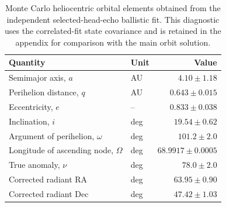 \begin{table}
  \centering
  \caption{Monte Carlo heliocentric orbital elements obtained from the
  independent selected-head-echo ballistic fit.  This diagnostic uses the
  correlated-fit state covariance and is retained in the appendix for
  comparison with the main orbit solution.}
  \label{tab:appendix-selected-head-echo-orbit}
  \begin{tabular}{llr}
    \toprule
    Quantity & Unit & Value \\
    \midrule
    Semimajor axis, $a$ & AU & $4.10 \pm 1.18$ \\
    Perihelion distance, $q$ & AU & $0.643 \pm 0.015$ \\
    Eccentricity, $e$ & -- & $0.833 \pm 0.038$ \\
    Inclination, $i$ & deg & $19.54 \pm 0.62$ \\
    Argument of perihelion, $\omega$ & deg & $101.2 \pm 2.0$ \\
    Longitude of ascending node, $\Omega$ & deg & $68.9917 \pm 0.0005$ \\
    True anomaly, $\nu$ & deg & $78.0 \pm 2.0$ \\
    Corrected radiant RA & deg & $63.95 \pm 0.90$ \\
    Corrected radiant Dec & deg & $47.42 \pm 1.03$ \\
    \bottomrule
  \end{tabular}
\end{table}
